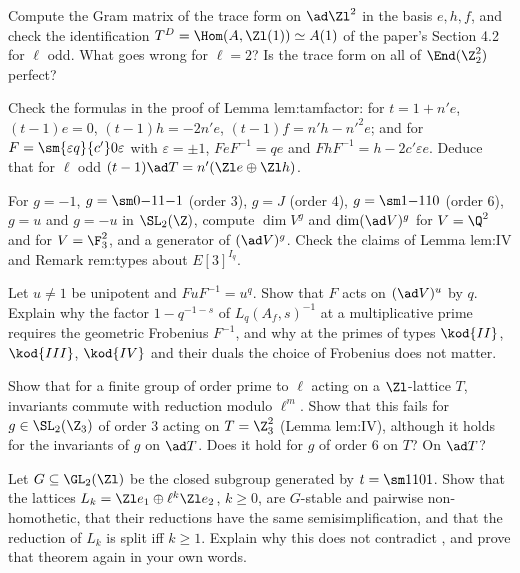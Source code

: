 \begin{exercise}\label{ex:reps:ex11}
Compute the Gram matrix of the trace form on $\ad\Zl^2$ in the basis $e,h,f$, and check the identification $T^D=\Hom(A,\Zl(1))\simeq A(1)$ of the paper's
Section 4.2 for $\ell$ odd. What goes wrong for $\ell=2$? Is the trace form on all of $\End(\Z_2^2)$ perfect?
\end{exercise}

\begin{exercise}\label{ex:reps:ex12}
Check the formulas in the proof of Lemma lem:tamfactor: for $t=1+n'e$, $(t-1)e=0$, $(t-1)h=-2n'e$, $(t-1)f=n'h-n'^2e$; and for
$F=\sm{\varepsilon q}{c'}0\varepsilon$ with $\varepsilon=\pm1$, $FeF^{-1}=qe$ and $FhF^{-1}=h-2c'\varepsilon e$. Deduce that for $\ell$ odd $(t-1)\ad T=n'(\Zl e\oplus\Zl h)$.
\end{exercise}

\begin{exercise}\label{ex:reps:ex13}
For $g=-1$, $g=\sm0{-1}1{-1}$ (order $3$), $g=J$ (order $4$), $g=\sm1{-1}10$ (order $6$), $g=u$ and $g=-u$ in $\SL_2(\Z)$, compute $\dim V^g$ and $\dim(\ad V)^g$ for
$V=\Q^2$ and for $V=\F_3^2$, and a generator of $(\ad V)^g$. Check the claims of Lemma lem:IV and Remark rem:types about $E[3]^{I_q}$.
\end{exercise}

\begin{exercise}\label{ex:reps:ex14}
Let $u\ne1$ be unipotent and $FuF^{-1}=u^q$. Show that $F$ acts on $(\ad V)^u$ by $q$. Explain why the factor $1-q^{-1-s}$ of $L_q(A_f,s)^{-1}$ at a
multiplicative prime requires the geometric Frobenius $F^{-1}$, and why at the primes of types $\kod{II}$, $\kod{III}$, $\kod{IV}$ and their duals the choice of
Frobenius does not matter.
\end{exercise}

\begin{exercise}\label{ex:reps:ex15}
Show that for a finite group of order prime to $\ell$ acting on a $\Zl$-lattice $T$, invariants commute with reduction modulo $\ell^m$. Show that this
fails for $g\in\SL_2(\Z_3)$ of order $3$ acting on $T=\Z_3^2$ (Lemma lem:IV), although it holds for the invariants of $g$ on $\ad T$. Does it hold for
$g$ of order $6$ on $T$? On $\ad T$?
\end{exercise}

\begin{exercise}\label{ex:reps:ex16}
Let $G\subseteq\GL_2(\Zl)$ be the closed subgroup generated by $t=\sm1101$. Show that the lattices $L_k=\Zl e_1\oplus\ell^k\Zl e_2$, $k\ge0$, are $G$-stable and pairwise
non-homothetic, that their reductions have the same semisimplification, and that the reduction of $L_k$ is split iff $k\ge1$. Explain why this
does not contradict , and prove that theorem again in your own words.
\end{exercise}

